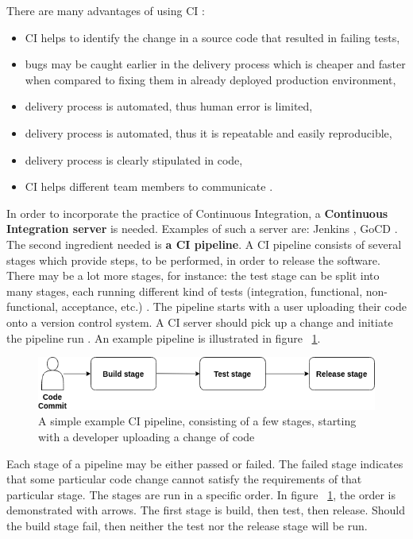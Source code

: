 There are many advantages of using CI \cite{book-cicd}:
\begin{itemize}
\item CI helps to identify the change in a source code that resulted in failing tests,
\item bugs may be caught earlier in the delivery process which is cheaper and faster when compared to fixing them in already deployed production environment,
\item delivery process is automated, thus human error is limited,
\item delivery process is automated, thus it is repeatable and easily reproducible,
\item delivery process is clearly stipulated in code,
\item CI helps different team members to communicate \cite{bachelor-ha}.
\end{itemize}

In order to incorporate the practice of Continuous Integration, a \textbf{Continuous Integration server} is needed. Examples of such a server are: Jenkins \cite{online-jenkins}, GoCD \cite{online-gocd}. The second ingredient needed is \textbf{a CI pipeline}. A CI pipeline consists of several stages which provide steps, to be performed, in order to release the software. There may be a lot more stages, for instance: the test stage can be split into many stages, each running different kind of tests (integration, functional, non-functional, acceptance, etc.) \cite{bachelor-ha, book-cicd}. The pipeline starts with a user uploading their code onto a version control system. A CI server should pick up a change and initiate the pipeline run \cite{book-pr-devops}. An example pipeline is illustrated in figure ~\ref{fig:pipeline}.

\begin{figure}[H]
    \centering
    \includegraphics[width=14cm]{figures/pipeline.png}
    \captionsetup{justification=centering,margin=2cm}
    \caption{A simple example CI pipeline, consisting of a few stages, starting with a developer uploading a change of code}
    \label{fig:pipeline}
\end{figure}

Each stage of a pipeline may be either passed or failed. The failed stage indicates that some particular code change cannot satisfy the requirements of that particular stage. The stages are run in a specific order. In figure ~\ref{fig:pipeline}, the order is demonstrated with arrows. The first stage is build, then test, then release. Should the build stage fail, then neither the test nor the release stage will be run.

